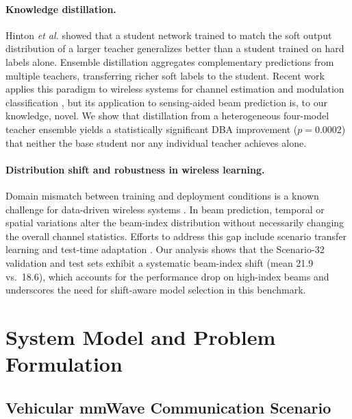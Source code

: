 \documentclass[journal,10pt,twoside]{IEEEtran}
\begin{document}
\paragraph{Knowledge distillation.}
Hinton \emph{et al.} \cite{Hinton2015KD} showed that a student network trained
to match the soft output distribution of a larger teacher generalizes better
than a student trained on hard labels alone. Ensemble distillation
\cite{Fukuda2017ens,Allen2020ensemble} aggregates complementary predictions
from multiple teachers, transferring richer soft labels to the student. Recent
work applies this paradigm to wireless systems for channel estimation
\cite{Guo2022distill} and modulation classification \cite{Zhang2022mod}, but
its application to sensing-aided beam prediction is, to our knowledge, novel.
We show that distillation from a heterogeneous four-model teacher ensemble
yields a statistically significant DBA improvement ($p=0.0002$) that neither
the base student nor any individual teacher achieves alone.

\paragraph{Distribution shift and robustness in wireless learning.}
Domain mismatch between training and deployment conditions is a known challenge
for data-driven wireless systems \cite{OShea2018overview,Shi2021shift}.
In beam prediction, temporal or spatial variations alter the beam-index
distribution without necessarily changing the overall channel statistics.
Efforts to address this gap include scenario transfer learning
\cite{Liu2022transfer} and test-time adaptation
\cite{Park2020TTA}. Our analysis shows that the Scenario-32 validation and
test sets exhibit a systematic beam-index shift (mean 21.9 vs.\ 18.6), which
accounts for the performance drop on high-index beams and underscores the need
for shift-aware model selection in this benchmark.

\section{System Model and Problem Formulation}
\label{sec:system}

\subsection{Vehicular mmWave Communication Scenario}
\end{document}
